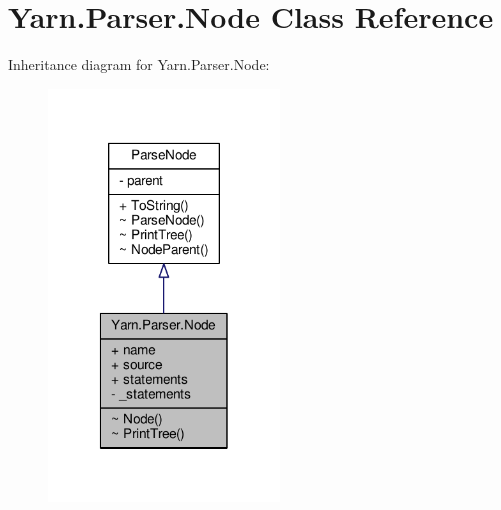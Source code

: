 \hypertarget{a00054}{\section{Yarn.\-Parser.\-Node Class Reference}
\label{a00054}
}


Inheritance diagram for Yarn.\-Parser.\-Node\-:
\nopagebreak
\begin{figure}[H]
\begin{center}
\leavevmode
\includegraphics[width=174pt]{a00272}
\end{center}
\end{figure}


